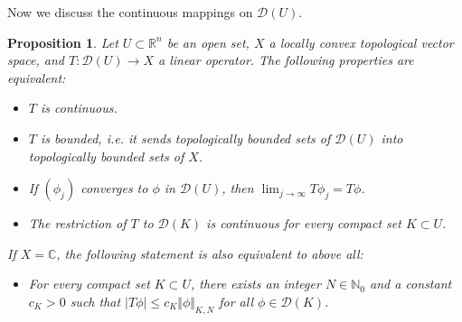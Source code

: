 \documentclass{article}
\numberwithin{equation}{section}
\newcommand{\bbC}{\mathbb{C}}
\newcommand{\bbN}{\mathbb{N}}
\newcommand{\bbR}{\mathbb{R}}
\renewcommand{\cal}{\mathcal}
\theoremstyle{plain}
\newtheorem{proposition}[theorem]{Proposition}
\theoremstyle{definition}
\begin{document}
Now we discuss the continuous mappings on $\cal{D}(U)$.
\begin{proposition}\label{contD}
Let $U\subset\bbR^n$ be an open set, $X$ a locally convex topological vector space, and $T:\cal{D}(U)\to X$ a linear operator. The following properties are equivalent:
	\begin{itemize}
		\item[(i)] $T$ is continuous.
		\item[(ii)] $T$ is bounded, i.e. it sends topologically bounded sets of $\cal{D}(U)$ into topologically bounded sets of $X$.
		\item[(iii)] If $(\phi_j)$ converges to $\phi$ in $\cal{D}(U)$, then $\lim_{j\to\infty} T\phi_j=T\phi$.
		\item[(iv)] The restriction of $T$ to $\cal{D}(K)$ is continuous for every compact set $K\subset U$.
	\end{itemize}
If $X=\bbC$, the following statement is also equivalent to above all:
\begin{itemize}
\item[(v)] For every compact set $K\subset U$, there exists an integer $N\in\bbN_0$ and a constant $c_K>0$ such that $\vert T\phi\vert\leq c_K\Vert\phi\Vert_{K,N}$ for all $\phi\in\cal{D}(K)$.
\end{itemize}
\end{proposition}
\end{document}
